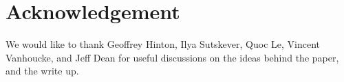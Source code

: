 \section*{Acknowledgement}

We would like to thank Geoffrey Hinton, Ilya Sutskever, Quoc Le, Vincent Vanhoucke, and Jeff Dean for useful discussions on the ideas behind the paper, and the write up.

